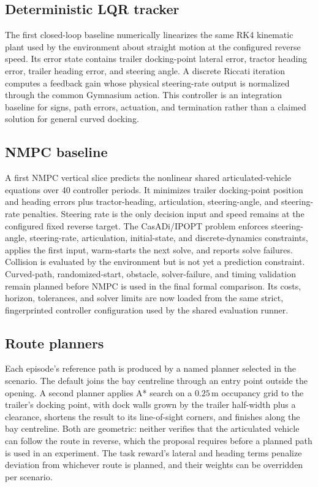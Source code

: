 \subsection{Deterministic LQR tracker}

\implemented{} The first closed-loop baseline numerically linearizes the same
RK4 kinematic plant used by the environment about straight motion at the
configured reverse speed. Its error state contains trailer docking-point
lateral error, tractor heading error, trailer heading error, and steering
angle. A discrete Riccati iteration computes a feedback gain whose physical
steering-rate output is normalized through the common Gymnasium action. This
controller is an integration baseline for signs, path errors, actuation, and
termination rather than a claimed solution for general curved docking.

\subsection{NMPC baseline}

\implemented{} A first NMPC vertical slice predicts the nonlinear shared
articulated-vehicle equations over 40 controller periods. It minimizes trailer
docking-point position and heading errors plus tractor-heading, articulation,
steering-angle, and steering-rate penalties. Steering rate is the only decision
input and speed remains at the configured fixed reverse target. The CasADi/IPOPT
problem enforces steering-angle, steering-rate, articulation, initial-state,
and discrete-dynamics constraints, applies the first input, warm-starts the next
solve, and reports solve failures. Collision is evaluated by the environment
but is not yet a prediction constraint. Curved-path, randomized-start,
obstacle, solver-failure, and timing validation remain planned before NMPC is
used in the final formal comparison. Its costs, horizon, tolerances, and
solver limits are now loaded from the same strict, fingerprinted controller
configuration used by the shared evaluation runner.

\subsection{Route planners}

\implemented{} Each episode's reference path is produced by a named planner
selected in the scenario. The default joins the bay centreline through an
entry point outside the opening. A second planner applies A* search on a
$0.25\,\mathrm{m}$ occupancy grid to the trailer's docking point, with dock
walls grown by the trailer half-width plus a clearance, shortens the result to
its line-of-sight corners, and finishes along the bay centreline. Both are
geometric: neither verifies that the articulated vehicle can follow the route
in reverse, which the proposal requires before a planned path is used in an
experiment. The task reward's lateral and heading terms penalize deviation
from whichever route is planned, and their weights can be overridden per
scenario.

